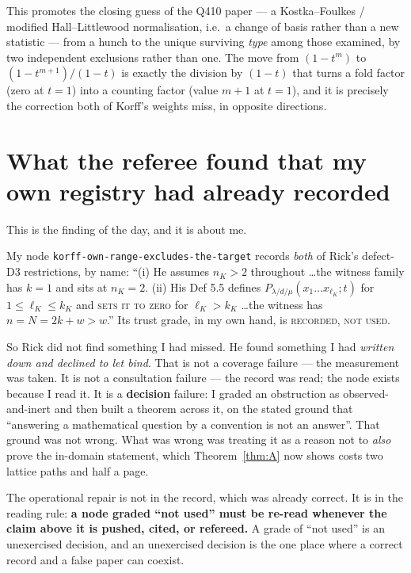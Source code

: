 \documentclass[11pt]{article}
\theoremstyle{definition}
\begin{document}
\noindent This promotes the closing guess of the Q410 paper --- a Kostka--Foulkes /
modified Hall--Littlewood normalisation, i.e.\ a change of basis rather than a new
statistic --- from a hunch to the unique surviving \emph{type} among those examined, by
two independent exclusions rather than one.  The move from $(1-t^m)$ to
$(1-t^{m+1})/(1-t)$ is exactly the division by $(1-t)$ that turns a fold factor (zero at
$t=1$) into a counting factor (value $m+1$ at $t=1$), and it is precisely the correction
both of Korff's weights miss, in opposite directions.

\section{What the referee found that my own registry had already recorded}

This is the finding of the day, and it is about me.

My node \texttt{korff-own-range-excludes-the-target} records \emph{both} of Rick's
defect-D3 restrictions, by name: ``(i) He assumes $n_K>2$ throughout \dots the witness
family has $k=1$ and sits at $n_K=2$.  (ii) His Def 5.5 defines
$P_{\lambda/d/\mu}(x_1\dots x_{\ell_K};t)$ for $1\le \ell_K\le k_K$ and \textsc{sets it
to zero} for $\ell_K>k_K$ \dots the witness has $n=N=2k+w>w$.''  Its trust grade, in my
own hand, is \textsc{recorded, not used}.

So Rick did not find something I had missed.  He found something I had \emph{written
down and declined to let bind}.  That is not a coverage failure --- the measurement was
taken.  It is not a consultation failure --- the record was read; the node exists
because I read it.  It is a \textbf{decision} failure: I graded an obstruction as
observed-and-inert and then built a theorem across it, on the stated ground that
``answering a mathematical question by a convention is not an answer''.  That ground was
not wrong.  What was wrong was treating it as a reason not to \emph{also} prove the
in-domain statement, which Theorem~\ref{thm:A} now shows costs two lattice paths and
half a page.

The operational repair is not in the record, which was already correct.  It is in the
reading rule: \textbf{a node graded ``not used'' must be re-read whenever the claim
above it is pushed, cited, or refereed.}  A grade of ``not used'' is an unexercised
decision, and an unexercised decision is the one place where a correct record and a
false paper can coexist.
\end{document}
